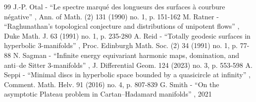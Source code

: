\begin{thebibliography}{99}
 J.-P. Otal - “Le spectre marqué des longueurs des surfaces à courbure négative” , Ann. of Math. (2) 131 (1990) no. 1, p. 151-162
 M. Ratner - “Raghunathan’s topological conjecture and distributions of unipotent flows” , Duke Math. J. 63 (1991) no. 1, p. 235-280
 A. Reid - “Totally geodesic surfaces in hyperbolic $3$-manifolds” , Proc. Edinburgh Math. Soc. (2) 34 (1991) no. 1, p. 77-88
 N. Sagman - “Infinite energy equivariant harmonic maps, domination, and anti–de Sitter 3-manifolds” , J. Differential Geom. 124 (2023) no. 3, p. 553-598
 A. Seppi - “Minimal discs in hyperbolic space bounded by a quasicircle at infinity” , Comment. Math. Helv. 91 (2016) no. 4, p. 807-839
 G. Smith - “On the asymptotic Plateau problem in Cartan–Hadamard manifolds” , 2021
\end{thebibliography}
